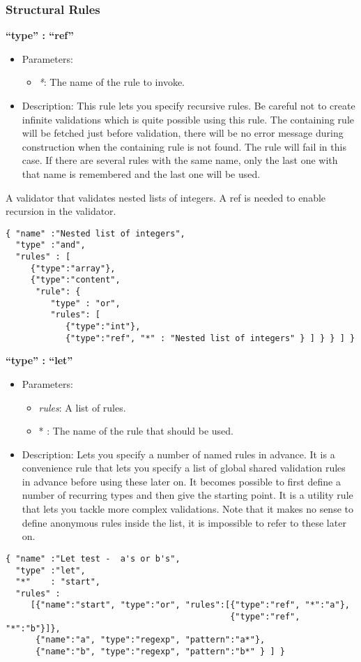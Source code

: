 \documentclass[a4paper]{article}
\newcommand{\ruledef}[3]{
\medskip
\textbf{#1}

\begin{itemize}
\setlength{\itemsep}{1pt}
\setlength{\parskip}{0pt}
\setlength{\parsep}{0pt}
   \item Parameters: #2
   \item Description: #3
\end{itemize}
}
\newcommand{\rulename}[1]{\textbf{``type'' : ``#1''}}
\newcommand{\param}[1]{\textsl{#1}:}
\begin{document}
\subsubsection{Structural Rules }

\ruledef{\rulename{ref}}{\begin{itemize} \item \param{*} The name of the rule to invoke. \end{itemize}}{ This rule lets you specify recursive rules. Be careful not to create infinite validations which is quite possible using this rule. The containing rule will be fetched just before validation, there will be no error message during construction when the containing rule is not found. The rule will fail in this case. If there are several rules with the same name, only the last one with that name is remembered and the last one will be used.}

A validator that validates nested lists of integers. A ref is needed to enable recursion in the validator.

\begin{lstlisting}
{ "name" :"Nested list of integers",
  "type" :"and",
  "rules" : [ 
     {"type":"array"},
     {"type":"content",
      "rule": {
         "type" : "or",
         "rules": [
            {"type":"int"}, 
            {"type":"ref", "*" : "Nested list of integers" } ] } } ] }
\end{lstlisting}

\ruledef{\rulename{let}}{\begin{itemize} \item \param{rules} A list of rules.\item * : The name of the rule that should be used.\end{itemize}}{Lets you specify a number of named rules in advance. It is a convenience rule that lets you specify a list of global shared validation rules in advance before using these later on. It becomes possible to first define a number of recurring types and then give the starting point. It is a utility rule that lets you tackle more complex validations. Note that it  makes no sense to define anonymous rules inside the list, it is impossible to refer to these later on.}

\begin{lstlisting}
{ "name" :"Let test -  a's or b's",
  "type" :"let",
  "*"    : "start",
  "rules" : 
     [{"name":"start", "type":"or", "rules":[{"type":"ref", "*":"a"}, 
                                             {"type":"ref", "*":"b"}]},
      {"name":"a", "type":"regexp", "pattern":"a*"},
      {"name":"b", "type":"regexp", "pattern":"b*" } ] }
\end{lstlisting}
\end{document}
